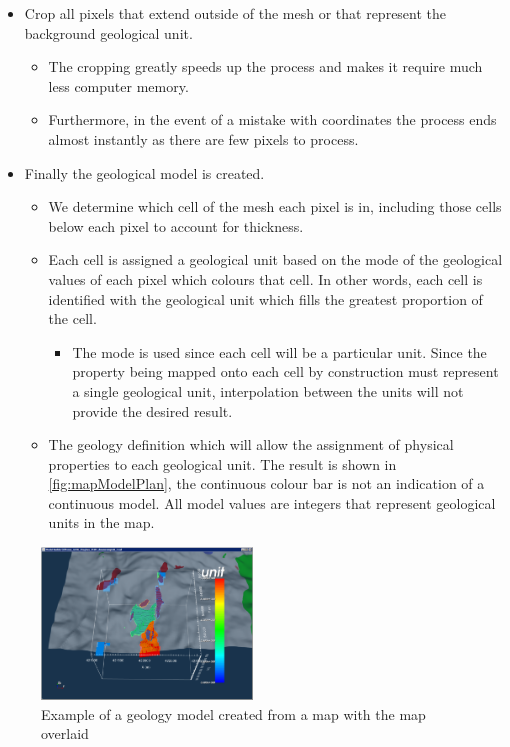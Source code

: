 \begin{itemize}
\item Crop all pixels that extend outside of the mesh or that represent the background geological unit.
\begin{itemize}
	\item The cropping greatly speeds up the process and makes it require much less computer memory.
	\item Furthermore, in the event of a mistake with coordinates the process ends almost instantly as there are few pixels to process.
\end{itemize}
\item Finally the geological model is created.
\begin{itemize}
	\item We determine which cell of the mesh each pixel is in, including those cells below each pixel to account for thickness.
	\item Each cell is assigned a geological unit based on the mode of the geological values of each pixel which colours that cell.  In other words, each cell is identified with the geological unit which fills the greatest proportion of the cell.
	\begin{itemize}
	\item The mode is used since each cell will be a particular unit. Since the property being mapped onto each cell by construction must represent a single geological unit, interpolation between the units will not provide the desired result.
	\end{itemize}
	\item The geology definition which will allow the assignment of physical properties to each geological unit. The result is shown in \autoref{fig:mapModelPlan}, the continuous colour bar is not an indication of a continuous model. All model values are integers that represent geological units in the map.
\end{itemize}
\end{itemize}
\begin{figure} [h]
    \centering
    \includegraphics[width=0.5\textwidth]{images/MaptoModel/mapModelPlan.PNG}
    \caption{Example of a geology model created from a map with the map overlaid}
    \label{fig:mapModelPlan}
\end{figure}

